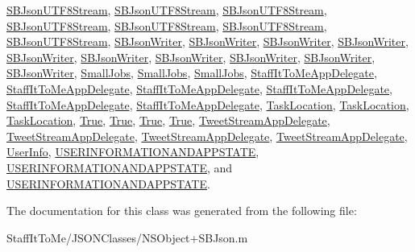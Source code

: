 \hyperlink{interface_s_b_json_u_t_f8_stream}{\-S\-B\-Json\-U\-T\-F8\-Stream}, \hyperlink{interface_s_b_json_u_t_f8_stream}{\-S\-B\-Json\-U\-T\-F8\-Stream}, \hyperlink{interface_s_b_json_u_t_f8_stream}{\-S\-B\-Json\-U\-T\-F8\-Stream}, \hyperlink{interface_s_b_json_u_t_f8_stream}{\-S\-B\-Json\-U\-T\-F8\-Stream}, \hyperlink{interface_s_b_json_u_t_f8_stream}{\-S\-B\-Json\-U\-T\-F8\-Stream}, \hyperlink{interface_s_b_json_u_t_f8_stream}{\-S\-B\-Json\-U\-T\-F8\-Stream}, \hyperlink{interface_s_b_json_u_t_f8_stream}{\-S\-B\-Json\-U\-T\-F8\-Stream}, \hyperlink{interface_s_b_json_writer}{\-S\-B\-Json\-Writer}, \hyperlink{interface_s_b_json_writer}{\-S\-B\-Json\-Writer}, \hyperlink{interface_s_b_json_writer}{\-S\-B\-Json\-Writer}, \hyperlink{interface_s_b_json_writer}{\-S\-B\-Json\-Writer}, \hyperlink{interface_s_b_json_writer}{\-S\-B\-Json\-Writer}, \hyperlink{interface_s_b_json_writer}{\-S\-B\-Json\-Writer}, \hyperlink{interface_s_b_json_writer}{\-S\-B\-Json\-Writer}, \hyperlink{interface_s_b_json_writer}{\-S\-B\-Json\-Writer}, \hyperlink{interface_s_b_json_writer}{\-S\-B\-Json\-Writer}, \hyperlink{interface_s_b_json_writer}{\-S\-B\-Json\-Writer}, \hyperlink{interface_small_jobs}{\-Small\-Jobs}, \hyperlink{interface_small_jobs}{\-Small\-Jobs}, \hyperlink{interface_small_jobs}{\-Small\-Jobs}, \hyperlink{interface_staff_it_to_me_app_delegate}{\-Staff\-It\-To\-Me\-App\-Delegate}, \hyperlink{interface_staff_it_to_me_app_delegate}{\-Staff\-It\-To\-Me\-App\-Delegate}, \hyperlink{interface_staff_it_to_me_app_delegate}{\-Staff\-It\-To\-Me\-App\-Delegate}, \hyperlink{interface_staff_it_to_me_app_delegate}{\-Staff\-It\-To\-Me\-App\-Delegate}, \hyperlink{interface_staff_it_to_me_app_delegate}{\-Staff\-It\-To\-Me\-App\-Delegate}, \hyperlink{interface_staff_it_to_me_app_delegate}{\-Staff\-It\-To\-Me\-App\-Delegate}, \hyperlink{interface_task_location}{\-Task\-Location}, \hyperlink{interface_task_location}{\-Task\-Location}, \hyperlink{interface_task_location}{\-Task\-Location}, \hyperlink{interface_true}{\-True}, \hyperlink{interface_true}{\-True}, \hyperlink{interface_true}{\-True}, \hyperlink{interface_true}{\-True}, \hyperlink{interface_tweet_stream_app_delegate}{\-Tweet\-Stream\-App\-Delegate}, \hyperlink{interface_tweet_stream_app_delegate}{\-Tweet\-Stream\-App\-Delegate}, \hyperlink{interface_tweet_stream_app_delegate}{\-Tweet\-Stream\-App\-Delegate}, \hyperlink{interface_tweet_stream_app_delegate}{\-Tweet\-Stream\-App\-Delegate}, \hyperlink{interface_user_info}{\-User\-Info}, \hyperlink{interface_u_s_e_r_i_n_f_o_r_m_a_t_i_o_n_a_n_d_a_p_p_s_t_a_t_e}{\-U\-S\-E\-R\-I\-N\-F\-O\-R\-M\-A\-T\-I\-O\-N\-A\-N\-D\-A\-P\-P\-S\-T\-A\-T\-E}, \hyperlink{interface_u_s_e_r_i_n_f_o_r_m_a_t_i_o_n_a_n_d_a_p_p_s_t_a_t_e}{\-U\-S\-E\-R\-I\-N\-F\-O\-R\-M\-A\-T\-I\-O\-N\-A\-N\-D\-A\-P\-P\-S\-T\-A\-T\-E}, and \hyperlink{interface_u_s_e_r_i_n_f_o_r_m_a_t_i_o_n_a_n_d_a_p_p_s_t_a_t_e}{\-U\-S\-E\-R\-I\-N\-F\-O\-R\-M\-A\-T\-I\-O\-N\-A\-N\-D\-A\-P\-P\-S\-T\-A\-T\-E}.



\-The documentation for this class was generated from the following file\-:\begin{DoxyCompactItemize}
\item 
\-Staff\-It\-To\-Me/\-J\-S\-O\-N\-Classes/\-N\-S\-Object+\-S\-B\-Json.\-m\end{DoxyCompactItemize}
